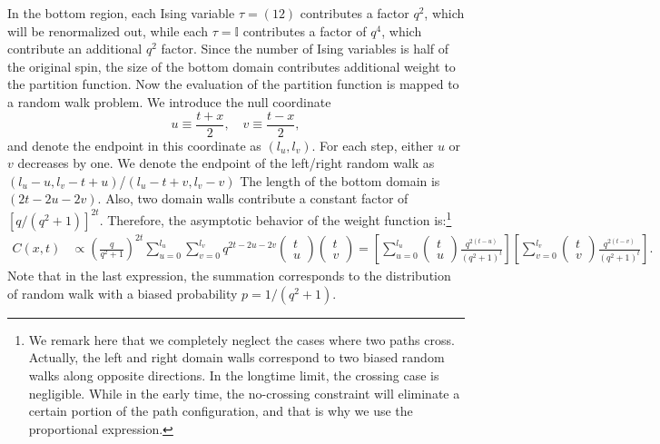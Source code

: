 \documentclass{SciPost}
\begin{document}
In the bottom region, each Ising variable $\tau = (12)$ contributes a factor $q^2$, which will be renormalized out, while each $\tau=\mathbb I$ contributes a factor of $q^4$, which contribute an additional $q^2$ factor.
Since the number of Ising variables is half of the original spin, the size of the bottom domain contributes additional weight to the partition function.
Now the evaluation of the partition function is mapped to a random walk problem.
We introduce the null coordinate
\begin{equation}
	u \equiv \frac{t+x}{2}, \quad 
	v \equiv \frac{t-x}{2},
\end{equation}
and denote the endpoint in this coordinate as $(l_u, l_v)$.
For each step, either $u$ or $v$ decreases by one.
We denote the endpoint of the left/right random walk as $(l_u-u,l_v-t+u)$/$(l_u-t+v,l_v-v)$
The length of the bottom domain is $(2t-2u-2v)$.
Also, two domain walls contribute a constant factor of $\left[q/(q^2+1)\right]^{2t}$.
Therefore, the asymptotic behavior of the weight function is:\footnote{We remark here that we completely neglect the cases where two paths cross. 
Actually, the left and right domain walls correspond to two biased random walks along opposite directions. 
In the longtime limit, the crossing case is negligible.
While in the early time, the no-crossing constraint will eliminate a certain portion of the path configuration, and that is why we use the proportional expression.}
\begin{equation*}
\begin{aligned}
	C(x,t) &\propto \left(\frac{q}{q^2+1}\right)^{2t}\sum_{u=0}^{l_u} \sum_{v=0}^{l_v} q^{2t-2u-2v} 
	\begin{pmatrix} t \\ u \end{pmatrix} \begin{pmatrix} t \\ v \end{pmatrix} 
	= \left[\sum_{u=0}^{l_u}\begin{pmatrix} t \\ u \end{pmatrix} \frac{q^{2(t-u)}}{(q^2+1)^t} \right]
	\left[\sum_{v=0}^{l_v}\begin{pmatrix} t \\ v \end{pmatrix} \frac{q^{2(t-v)}}{(q^2+1)^t} \right].
\end{aligned}
\end{equation*}
Note that in the last expression, the summation corresponds to the distribution of random walk with a biased probability $p = 1/(q^2+1)$.
\end{document}
